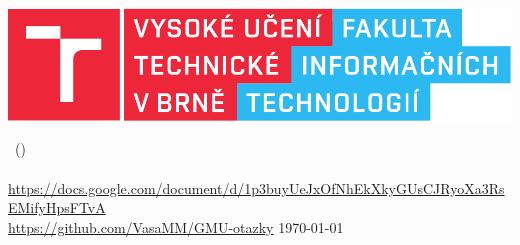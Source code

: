 \includegraphics{FIT.pdf}

\begin{center}
	\LARGE
	\courseName\ (\courseShortcut)\\
	\Huge
		\projectName\\
	\normalsize
	\flushleft
	\url{https://docs.google.com/document/d/1p3buyUeJxOfNhEkXkyGUsCJRyoXa3RsEMifyHpsFTvA} \\
	\url{https://github.com/VasaMM/GMU-otazky}
	\hfill
	\today
\end{center}




\newpage
{}
\tableofcontents
\newpage

